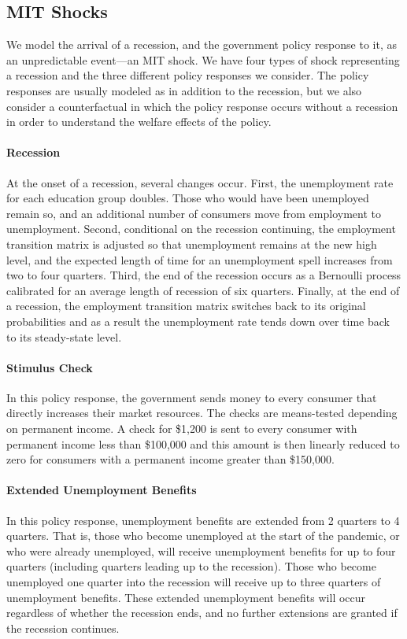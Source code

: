 \documentclass[../HAFiscal]{subfiles}
\begin{document}
	\subsection{MIT Shocks}
	We model the arrival of a recession, and the government policy response to it, as an unpredictable event---an MIT shock. We have four types of shock representing a recession and the three different policy responses we consider. The policy responses are usually modeled as in addition to the recession, but we also consider a counterfactual in which the policy response occurs without a recession in order to understand the welfare effects of the policy.
	
	\paragraph{Recession} At the onset of a recession, several changes occur. First, the unemployment rate for each education group doubles. Those who would have been unemployed remain so, and an additional number of consumers move from employment to unemployment. Second, conditional on the recession continuing, the employment transition matrix is adjusted so that unemployment remains at the new high level, and the expected length of time for an unemployment spell increases from two to four quarters. Third, the end of the recession occurs as a Bernoulli process calibrated for an average length of recession of six quarters. Finally, at the end of a recession, the employment transition matrix switches back to its original probabilities and as a result the unemployment rate tends down over time back to its steady-state level.
	
	\paragraph{Stimulus Check} In this policy response, the government sends money to every consumer that directly increases their market resources. The checks are means-tested depending on permanent income. A check for \$1,200 is sent to every consumer with permanent income less than \$100,000 and this amount is then linearly reduced to zero for consumers with a permanent income greater than \$150,000.
	
	\paragraph{Extended Unemployment Benefits} In this policy response, unemployment benefits are extended from 2 quarters to 4 quarters. That is, those who become unemployed at the start of the pandemic, or who were already unemployed, will receive unemployment benefits for up to four quarters (including quarters leading up to the recession). Those who become unemployed one quarter into the recession will receive up to three quarters of unemployment benefits. These extended unemployment benefits will occur regardless of whether the recession ends, and no further extensions are granted if the recession continues.
	
\end{document}
